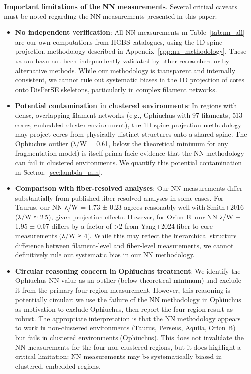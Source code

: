 \documentclass[twoside,twocolumn]{mnras}
\begin{document}
\textbf{Important limitations of the NN measurements}. Several critical caveats must be noted regarding the NN measurements presented in this paper:

\begin{itemize}
    \item \textbf{No independent verification}: All NN measurements in Table~\ref{tab:nn_all} are our own computations from HGBS catalogues, using the 1D spine projection methodology described in Appendix~\ref{app:nn_methodology}. These values have not been independently validated by other researchers or by alternative methods. While our methodology is transparent and internally consistent, we cannot rule out systematic biases in the 1D projection of cores onto DisPerSE skeletons, particularly in complex filament networks.
    \item \textbf{Potential contamination in clustered environments}: In regions with dense, overlapping filament networks (e.g., Ophiuchus with 97 filaments, 513 cores, embedded cluster environment), the 1D spine projection methodology may project cores from physically distinct structures onto a shared spine. The Ophiuchus outlier (λ/W = 0.61, below the theoretical minimum for any fragmentation model) is itself prima facie evidence that the NN methodology can fail in clustered environments. We quantify this potential contamination in Section~\ref{sec:lambda_min}.
    \item \textbf{Comparison with fiber-resolved analyses}: Our NN measurements differ substantially from published fiber-resolved analyses in some cases. For Taurus, our NN λ/W = 1.73 ± 0.23 agrees reasonably well with Smith+2016 (λ/W ≈ 2.5), given projection effects. However, for Orion B, our NN λ/W = 1.95 ± 0.07 differs by a factor of >2 from Yang+2024 fiber-to-core measurements (λ/W ≈ 4). While this may reflect the hierarchical structure difference between filament-level and fiber-level measurements, we cannot definitively rule out systematic bias in our NN methodology.
    \item \textbf{Circular reasoning concern in Ophiuchus treatment}: We identify the Ophiuchus NN value as an outlier (below theoretical minimum) and exclude it from the primary four-region measurement. However, this reasoning is potentially circular: we use the failure of the NN methodology in Ophiuchus as motivation to exclude Ophiuchus, then report the four-region result as robust. The appropriate interpretation is that the NN methodology appears to work in non-clustered environments (Taurus, Perseus, Aquila, Orion B) but fails in clustered environments (Ophiuchus). This does not invalidate the NN measurements for the four non-clustered regions, but it does highlight a critical limitation: NN measurements may be systematically biased in clustered, embedded regions.
\end{itemize}
\end{document}
